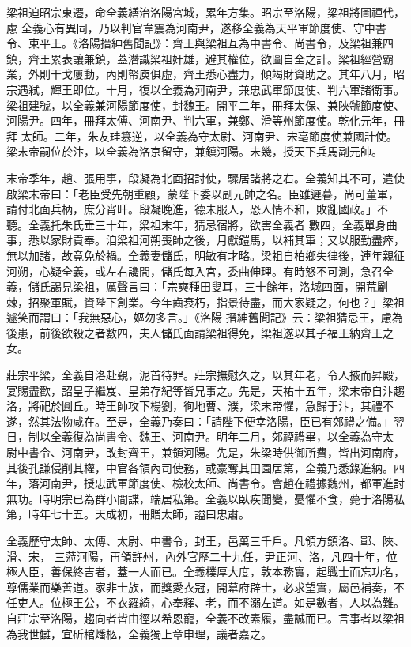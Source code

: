 \begin{pinyinscope}
 梁祖迫昭宗東遷，命全義繕治洛陽宮城，累年方集。昭宗至洛陽，梁祖將圖禪代，慮
 全義心有異同，乃以判官韋震為河南尹，遂移全義為天平軍節度使、守中書令、東平王。《洛陽搢紳舊聞記》：齊王與梁祖互為中書令、尚書令，及梁祖兼四鎮，齊王累表讓兼鎮，蓋潛識梁祖奸雄，避其權位，欲圖自全之計。梁祖經營霸業，外則干戈屢動，內則帑庾俱虛，齊王悉心盡力，傾竭財資助之。其年八月，昭宗遇弒，輝王即位。十月，復以全義為河南尹，兼忠武軍節度使、判六軍諸衛事。梁祖建號，以全義兼河陽節度使，封魏王。開平二年，冊拜太保、兼陜虢節度使、河陽尹。四年，冊拜太傅、河南尹、判六軍，兼鄭、滑等州節度使。乾化元年，冊拜
 太師。二年，朱友珪篡逆，以全義為守太尉、河南尹、宋亳節度使兼國計使。梁末帝嗣位於汴，以全義為洛京留守，兼鎮河陽。未幾，授天下兵馬副元帥。



 末帝季年，趙、張用事，段凝為北面招討使，驟居諸將之右。全義知其不可，遣使啟梁末帝曰：「老臣受先朝重顧，蒙陛下委以副元帥之名。臣雖遲暮，尚可董軍，請付北面兵柄，庶分宵旰。段凝晚進，德未服人，恐人情不和，敗亂國政。」不聽。全義托朱氏垂三十年，梁祖末年，猜忌宿將，欲害全義者
 數四，全義單身曲事，悉以家財貢奉。洎梁祖河朔喪師之後，月獻鎧馬，以補其軍；又以服勤盡瘁，無以加諸，故竟免於禍。全義妻儲氏，明敏有才略。梁祖自柏鄉失律後，連年親征河朔，心疑全義，或左右讒間，儲氏每入宮，委曲伸理。有時怒不可測，急召全義，儲氏謁見梁祖，厲聲言曰：「宗奭種田叟耳，三十餘年，洛城四面，開荒劚棘，招聚軍賦，資陛下創業。今年齒衰朽，指景待盡，而大家疑之，何也？」梁祖遽笑而謂曰：「我無惡心，嫗勿多言。」《洛陽
 搢紳舊聞記》云：梁祖猜忌王，慮為後患，前後欲殺之者數四，夫人儲氏面請梁祖得免，梁祖遂以其子福王納齊王之女。



 莊宗平梁，全義自洛赴覲，泥首待罪。莊宗撫慰久之，以其年老，令人掖而昇殿，宴賜盡歡，詔皇子繼岌、皇弟存紀等皆兄事之。先是，天祐十五年，梁末帝自汴趨洛，將祀於圓丘。時王師攻下楊劉，徇地曹、濮，梁末帝懼，急歸于汴，其禮不遂，然其法物咸在。至是，全義乃奏曰：「請陛下便幸洛陽，臣已有郊禮之備。」翌日，制以全義復為尚書令、魏王、河南尹。明年二月，郊禋禮畢，以全義為守太
 尉中書令、河南尹，改封齊王，兼領河陽。先是，朱梁時供御所費，皆出河南府，其後孔謙侵削其權，中官各領內司使務，或豪奪其田園居第，全義乃悉錄進納。四年，落河南尹，授忠武軍節度使、檢校太師、尚書令。會趙在禮據魏州，都軍進討無功。時明宗已為群小間諜，端居私第。全義以臥疾聞變，憂懼不食，薨于洛陽私第，時年七十五。天成初，冊贈太師，謚曰忠肅。



 全義歷守太師、太傅、太尉、中書令，封王，邑萬三千戶。凡領方鎮洛、鄆、陜、滑、宋，
 三蒞河陽，再領許州，內外官歷二十九任，尹正河、洛，凡四十年，位極人臣，善保終吉者，蓋一人而已。全義樸厚大度，敦本務實，起戰士而忘功名，尊儒業而樂善道。家非士族，而獎愛衣冠，開幕府辟士，必求望實，屬邑補奏，不任吏人。位極王公，不衣羅綺，心奉釋、老，而不溺左道。如是數者，人以為難。自莊宗至洛陽，趨向者皆由徑以希恩寵，全義不改素履，盡誠而已。言事者以梁祖為我世讎，宜斫棺燔柩，全義獨上章申理，議者嘉之。




\end{pinyinscope}
